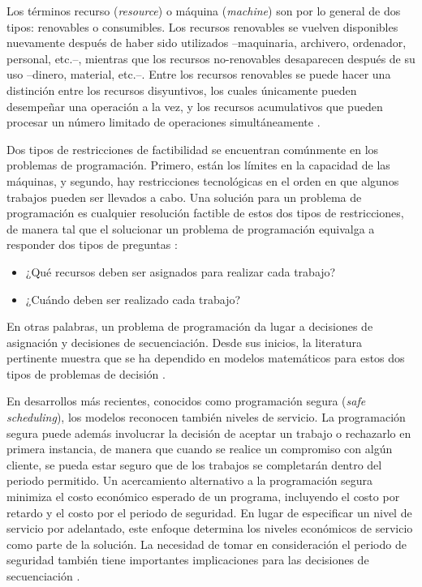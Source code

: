 \documentclass[spanish,draft,12pt,headsepline,footsepline,paper=letter]{scrreprt}
\begin{document}
Los términos recurso (\textit{resource}) o máquina (\textit{machine}) son por lo general de dos tipos: renovables o consumibles. Los recursos renovables se vuelven disponibles nuevamente después de haber sido utilizados –maquinaria, archivero, ordenador, personal, etc.–, mientras que los recursos no-renovables desaparecen después de su uso –dinero, material, etc.–. Entre los recursos renovables se puede hacer una distinción entre los recursos disyuntivos, los cuales únicamente pueden desempeñar una operación a la vez, y los recursos acumulativos que pueden procesar un número limitado de operaciones simultáneamente \citep[p.~6]{TKindt2002}.

Dos tipos de restricciones de factibilidad se encuentran comúnmente en los problemas de programación. Primero, están los límites en la capacidad de las máquinas, y segundo, hay restricciones tecnológicas en el orden en que algunos trabajos pueden ser llevados a cabo. Una solución para un problema de programación es cualquier resolución factible de estos dos tipos de restricciones, de manera tal que el solucionar un problema de programación equivalga a responder dos tipos de preguntas \citep[p.~4]{Baker2009}:

\begin{itemize}
\setlength{\itemsep}{0cm}%
\setlength{\parskip}{0cm}%
\item¿Qué recursos deben ser asignados para realizar cada trabajo?
\item¿Cuándo deben ser realizado cada trabajo?
\end{itemize}

En otras palabras, un problema de programación da lugar a decisiones de asignación y decisiones de secuenciación. Desde sus inicios, la literatura pertinente muestra que se ha dependido en modelos matemáticos para estos dos tipos de problemas de decisión \citep[p.~4,~5]{Baker2009}.

En desarrollos más recientes, conocidos como programación segura (\textit{safe scheduling}), los modelos reconocen también niveles de servicio. La programación segura puede además involucrar la decisión de aceptar un trabajo o rechazarlo en primera instancia, de manera que cuando se realice un compromiso con algún cliente, se pueda estar seguro que de los trabajos se completarán dentro del periodo permitido. Un acercamiento alternativo a la programación segura minimiza el costo económico esperado de un programa, incluyendo el costo por retardo y el costo por el periodo de seguridad. En lugar de especificar un nivel de servicio por adelantado, este enfoque determina los niveles económicos de servicio como parte de la solución. La necesidad de tomar en consideración el periodo de seguridad también tiene importantes implicaciones para las decisiones de secuenciación \citep[p.~5]{Baker2009}.
\end{document}
